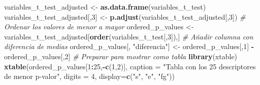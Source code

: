 \documentclass[]{article}
\newenvironment{Shaded}{\begin{snugshade}}{\end{snugshade}}
\newcommand{\KeywordTok}[1]{\textcolor[rgb]{0.13,0.29,0.53}{\textbf{#1}}}
\newcommand{\DataTypeTok}[1]{\textcolor[rgb]{0.13,0.29,0.53}{#1}}
\newcommand{\DecValTok}[1]{\textcolor[rgb]{0.00,0.00,0.81}{#1}}
\newcommand{\StringTok}[1]{\textcolor[rgb]{0.31,0.60,0.02}{#1}}
\newcommand{\CommentTok}[1]{\textcolor[rgb]{0.56,0.35,0.01}{\textit{#1}}}
\newcommand{\ControlFlowTok}[1]{\textcolor[rgb]{0.13,0.29,0.53}{\textbf{#1}}}
\newcommand{\OperatorTok}[1]{\textcolor[rgb]{0.81,0.36,0.00}{\textbf{#1}}}
\newcommand{\NormalTok}[1]{#1}
\begin{document}
\begin{Shaded}
\end{Shaded}

\begin{Shaded}
\begin{Highlighting}[]
\NormalTok{variables_t_test_adjusted <-}\StringTok{ }\KeywordTok{as.data.frame}\NormalTok{(variables_t_test)}
\NormalTok{variables_t_test_adjusted[,}\DecValTok{3}\NormalTok{] <-}\StringTok{ }\KeywordTok{p.adjust}\NormalTok{(variables_t_test_adjusted[,}\DecValTok{3}\NormalTok{])}
\CommentTok{# Ordenar los valores de menor a mayor}
\NormalTok{ordered_p_values <-}\StringTok{ }\NormalTok{variables_t_test_adjusted[}\KeywordTok{order}\NormalTok{(variables_t_test[,}\DecValTok{3}\NormalTok{]),]}
\CommentTok{# Añadir columna con diferencia de medias}
\NormalTok{ordered_p_values[, }\StringTok{"diferencia"}\NormalTok{] <-}\StringTok{ }\NormalTok{ordered_p_values[,}\DecValTok{1}\NormalTok{] }\OperatorTok{-}\StringTok{ }\NormalTok{ordered_p_values[,}\DecValTok{2}\NormalTok{]}
\CommentTok{# Preparar para mostrar como tabla}
\KeywordTok{library}\NormalTok{(xtable)}
\KeywordTok{xtable}\NormalTok{(ordered_p_values[}\DecValTok{1}\OperatorTok{:}\DecValTok{25}\NormalTok{,}\OperatorTok{-}\KeywordTok{c}\NormalTok{(}\DecValTok{1}\NormalTok{,}\DecValTok{2}\NormalTok{)],}
       \DataTypeTok{caption =} \StringTok{"Tabla con los 25 descriptores de menor p-valor"}\NormalTok{,}
       \DataTypeTok{digits =} \DecValTok{4}\NormalTok{,}
       \DataTypeTok{display=}\KeywordTok{c}\NormalTok{(}\StringTok{"s"}\NormalTok{, }\StringTok{"e"}\NormalTok{, }\StringTok{"fg"}\NormalTok{))}
\end{Highlighting}
\end{Shaded}
\end{document}
